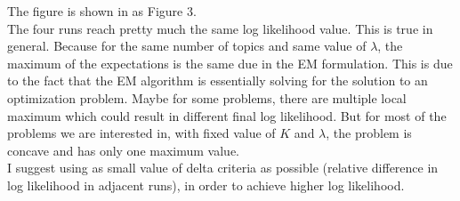 The figure is shown in as Figure 3. \\
The four runs reach pretty much the same log likelihood value. This is true in general. Because for the same number of topics and same value of $\lambda$, the maximum of the expectations is the same due in the EM formulation. This is due to the fact that the EM algorithm is essentially solving for the solution to an optimization problem. Maybe for some problems, there are multiple local maximum which could result in different final log likelihood. But for most of the problems we are interested in, with fixed value of $K$ and $\lambda$, the problem is concave and has only one maximum value.  \\
I suggest using as small value of delta criteria as possible (relative difference in log likelihood in adjacent runs), in order to achieve higher log likelihood. 



